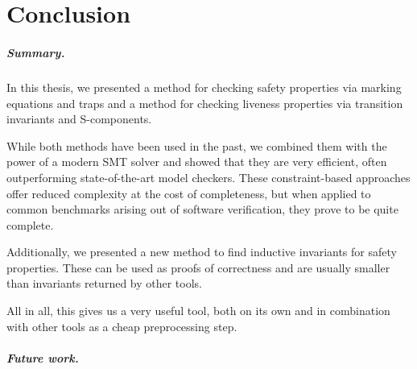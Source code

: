 \chapter{Conclusion}
\label{chap:conclusion}

\paragraph{Summary.}

In this thesis, we presented
a method for checking safety properties via marking equations and traps
and a method for checking liveness properties via transition invariants and S-components.

While both methods have been used in the past, we combined them with the power of a modern
SMT solver and showed that they are very efficient, often outperforming
state-of-the-art model checkers.
These constraint-based approaches offer reduced complexity at the cost of completeness,
but when applied to common benchmarks arising out of software verification, they prove to be
quite complete.

Additionally, we presented a new method to find inductive invariants for safety properties.
These can be used as proofs of correctness and are usually smaller than invariants returned
by other tools.

All in all, this gives us a very useful tool,
both on its own and in combination with other tools as a cheap preprocessing step.


\paragraph{Future work.}

